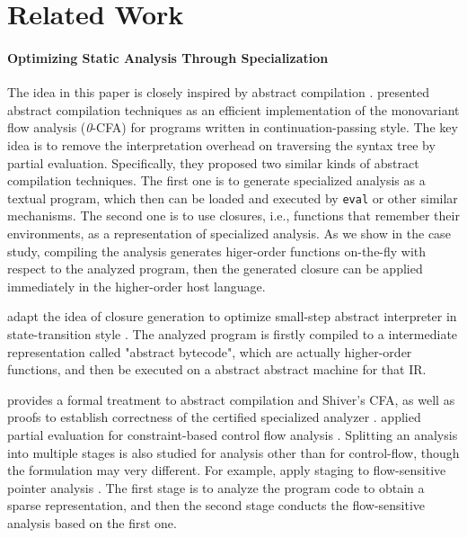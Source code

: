 \section{Related Work}

\paragraph{Optimizing Static Analysis Through Specialization}
The idea in this paper is closely inspired by abstract compilation
\cite{Boucher:1996:ACN:647473.727587}.
\citeauthor{Boucher:1996:ACN:647473.727587} presented abstract compilation
techniques as an efficient implementation of the monovariant flow analysis
(\textit{0}-CFA) for programs written in continuation-passing style. The key
idea is to remove the interpretation overhead on traversing the syntax tree by
partial evaluation. Specifically, they proposed two similar kinds of abstract
compilation techniques. The first one is to generate specialized analysis as a
textual program, which then can be loaded and executed by \texttt{eval} or other
similar mechanisms. The second one is to use closures, i.e., functions that
remember their environments, as a representation of specialized analysis. As we
show in the case study, compiling the analysis generates higer-order functions
on-the-fly with respect to the analyzed program, then the generated closure can
be applied immediately in the higher-order host language.

\citeauthor{Johnson:2013:OAA:2500365.2500604} adapt the idea of closure
generation to optimize small-step abstract interpreter in state-transition style
\cite{Johnson:2013:OAA:2500365.2500604}. The analyzed program is firstly
compiled to a intermediate representation called "abstract bytecode", which are
actually higher-order functions, and then be executed on a abstract abstract
machine for that IR.

\citet{damian1999partial} provides a formal treatment to abstract compilation
and Shiver's CFA, as well as proofs to establish correctness of the certified
specialized analyzer \cite{damian1999partial}. \citeauthor{amtoft1999partial}
applied partial evaluation for constraint-based control flow analysis
\cite{amtoft1999partial}. Splitting an analysis into multiple stages is also
studied for analysis other than for control-flow, though the formulation may very
different. For example, \citeauthor{DBLP:conf/cgo/HardekopfL11} apply staging to
flow-sensitive pointer analysis \cite{DBLP:conf/cgo/HardekopfL11}. The first
stage is to analyze the program code to obtain a sparse representation, and then
the second stage conducts the flow-sensitive analysis based on the first one.

